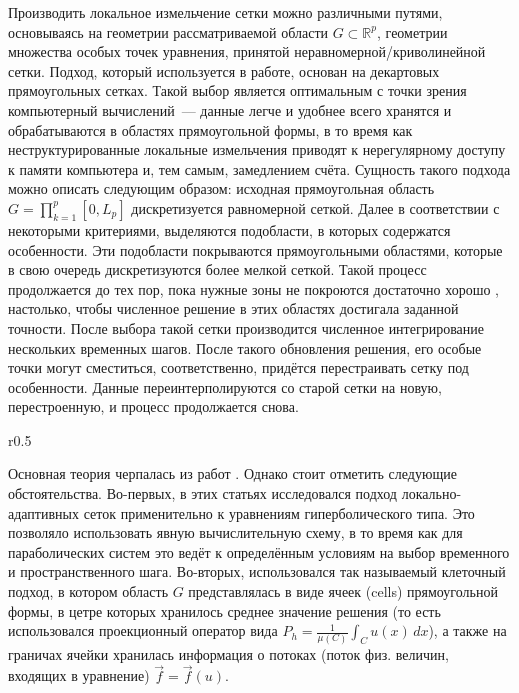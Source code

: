 Производить локальное измельчение сетки можно различными путями, основываясь на геометрии рассматриваемой области $G\subset\mathbb{R}^p$, геометрии множества особых точек уравнения, принятой неравномерной/криволинейной сетки.
Подход, который используется в работе, основан на декартовых прямоугольных сетках.
Такой выбор является оптимальным с точки зрения компьютерный вычислений~--- данные легче и удобнее всего хранятся и обрабатываются в областях прямоугольной формы, в то время как неструктурированные локальные измельчения приводят к нерегулярному доступу к памяти компьютера и, тем самым, замедлением счёта.
Сущность такого подхода можно описать следующим образом: исходная прямоугольная область
$
    G = \prod_{k = 1}^{p} [0, L_p]
$
дискретизуется равномерной сеткой.
Далее в соответствии с некоторыми критериями, выделяются подобласти, в которых содержатся особенности.
Эти подобласти покрываются прямоугольными областями, которые в свою очередь дискретизуются более мелкой сеткой.
Такой процесс продолжается до тех пор, пока нужные зоны \glqq не покроются достаточно хорошо \grqq, настолько, чтобы численное решение в этих областях достигала заданной точности.
После выбора такой сетки производится численное интегрирование нескольких временных шагов.
После такого обновления решения, его особые точки могут сместиться, соответственно, придётся перестраивать сетку под особенности.
Данные переинтерполируются со старой сетки на новую, перестроенную, и процесс продолжается снова.

\begin{wrapfigure}{r}{0.5\textwidth}
    \begin{center}
    \end{center}
\end{wrapfigure}
Основная теория черпалась из работ \cite{berger1982adaptive, berger1989local, deiterding2011block}.
Однако стоит отметить следующие обстоятельства.
Во-первых, в этих статьях исследовался подход локально-адаптивных сеток применительно к уравнениям гиперболического типа.
Это позволяло использовать явную вычислительную схему, в то время как для параболических систем это ведёт к определённым условиям на выбор временного и пространственного шага.
Во-вторых, использовался так называемый клеточный подход, в котором область $G$ представлялась в виде ячеек (cells) прямоугольной формы, в цетре которых хранилось среднее значение решения (то есть использовался проекционный оператор вида $P_h = \frac{1}{\mu(C)} \int_{C} u(x)\, dx$), а также на граничах ячейки хранилась информация о потоках (поток физ. величин, входящих в уравнение) $\vec f = \vec f(u)$.
